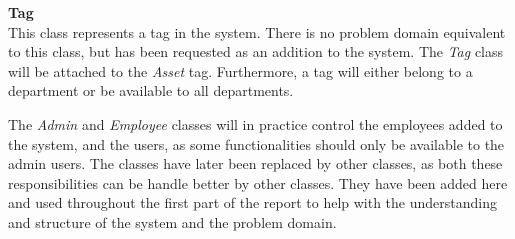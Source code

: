 \textbf{Tag}\\
This class represents a tag in the system. There is no problem domain equivalent to this class, but has been requested as an addition to the system. The \textit{Tag} class will be attached to the \textit{Asset} tag. Furthermore, a tag will either belong to a department or be available to all departments.
\newline

The \textit{Admin} and \textit{Employee} classes will in practice control the employees added to the system, and the users, as some functionalities should only be available to the admin users. The classes have later been replaced by other classes, as both these responsibilities can be handle better by other classes. They have been added here and used throughout the first part of the report to help with the understanding and structure of the system and the problem domain.